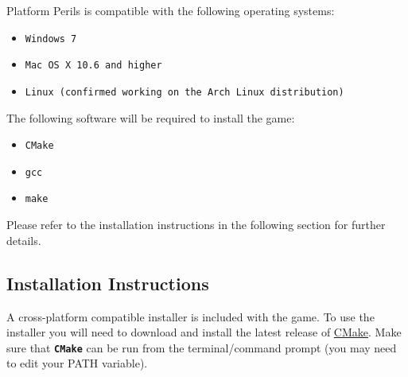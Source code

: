 \documentclass[12pt, titlepage]{article}
\begin{document}
Platform Perils is compatible with the following operating systems:
\begin{itemize}
  \item \texttt{Windows 7}
  \item \texttt{Mac OS X 10.6 and higher}
  \item \texttt{Linux (confirmed working on the Arch Linux distribution)}
\end{itemize}
\newpage
\noindent The following software will be required to install the game:
\begin{itemize}
  \item \texttt{CMake}
  \item \texttt{gcc}
  \item \texttt{make}
\end{itemize}

\noindent Please refer to the installation instructions in the following section for further details.

\subsection{Installation Instructions}
A cross-platform compatible installer is included with the game.  To use the installer you will need to download and install the latest release of \href{https://cmake.org/}{CMake}.  Make sure that \texttt{\bf CMake} can be run from the terminal/command prompt (you may need to edit your PATH variable).
\end{document}
